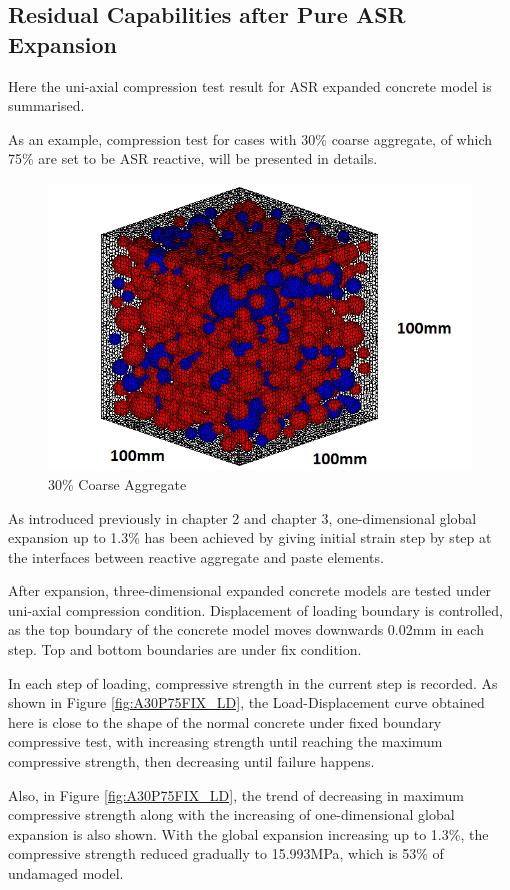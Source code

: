 \clearpage

\subsection{Residual Capabilities after Pure ASR Expansion}

Here the uni-axial compression test result for ASR expanded concrete model is summarised.

As an example, compression test for cases with 30\% coarse aggregate, of which 75\% are set to be ASR reactive, will be presented in details.

\begin{figure}[ht!]
\centering
\includegraphics[width=.3\linewidth]{Files/Aggregate/A30P75.png}
  \caption{30\% Coarse Aggregate}
  \label{fig:A30P75_model}
\end{figure}

As introduced previously in chapter 2 and chapter 3, one-dimensional global expansion up to 1.3\% has been achieved by giving initial strain step by step at the interfaces between reactive aggregate and paste elements.

After expansion, three-dimensional expanded concrete models are tested under uni-axial compression condition. Displacement of loading boundary is controlled, as the top boundary of the concrete model moves downwards 0.02mm in each step. Top and bottom boundaries are under fix condition.

In each step of loading, compressive strength in the current step is recorded. As shown in Figure \ref{fig:A30P75FIX_LD}, the Load-Displacement curve obtained here is close to the shape of the normal concrete under fixed boundary compressive test, with increasing strength until reaching the maximum compressive strength, then decreasing until failure happens.

Also, in Figure \ref{fig:A30P75FIX_LD}, the trend of decreasing in maximum compressive strength along with the increasing of one-dimensional global expansion is also shown. With the global expansion increasing up to 1.3\%, the compressive strength reduced gradually to 15.993MPa, which is 53\% of undamaged model.


